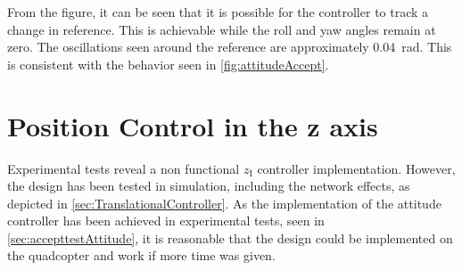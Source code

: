 From the figure, it can be seen that it is possible for the controller to track a change in reference. This is achievable while the roll and yaw angles remain at zero. The oscillations seen around the reference are approximately \SI{0.04}{rad}. This is consistent with the behavior seen in \autoref{fig:attitudeAccept}.



\section{Position Control in the z axis}

Experimental tests reveal a non functional $z_{\mathrm{I}}$ controller implementation. However, the design has been tested in simulation, including the network effects, as depicted in \autoref{sec:TranslationalController}. As the implementation of the attitude controller has been achieved in experimental tests, seen in \autoref{sec:accepttestAttitude}, it is reasonable that the design could be implemented on the quadcopter and work if more time was given.



